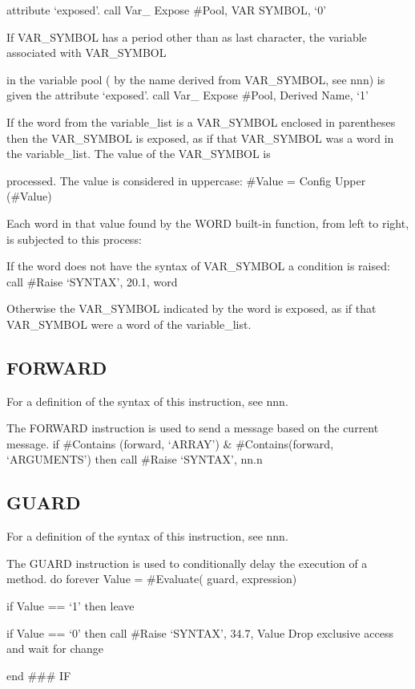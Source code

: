 attribute `exposed'. call Var\_ Expose \#Pool, VAR SYMBOL, `0'

If VAR\_SYMBOL has a period other than as last character, the variable
associated with VAR\_SYMBOL

in the variable pool ( by the name derived from VAR\_SYMBOL, see nnn) is
given the attribute `exposed'. call Var\_ Expose \#Pool, Derived Name,
`1'

If the word from the variable\_list is a VAR\_SYMBOL enclosed in
parentheses then the VAR\_SYMBOL is exposed, as if that VAR\_SYMBOL was
a word in the variable\_list. The value of the VAR\_SYMBOL is

processed. The value is considered in uppercase: \#Value = Config Upper
(\#Value)

Each word in that value found by the WORD built-in function, from left
to right, is subjected to this process:

If the word does not have the syntax of VAR\_SYMBOL a condition is
raised: call \#Raise `SYNTAX', 20.1, word

Otherwise the VAR\_SYMBOL indicated by the word is exposed, as if that
VAR\_SYMBOL were a word of the variable\_list.

\hypertarget{forward}{%
\subsection{FORWARD}\label{forward}}

For a definition of the syntax of this instruction, see nnn.

The FORWARD instruction is used to send a message based on the current
message. if \#Contains (forward, `ARRAY') \& \#Contains(forward,
`ARGUMENTS') then call \#Raise `SYNTAX', nn.n

\hypertarget{guard}{%
\subsection{GUARD}\label{guard}}

For a definition of the syntax of this instruction, see nnn.

The GUARD instruction is used to conditionally delay the execution of a
method. do forever Value = \#Evaluate( guard, expression)

if Value == `1' then leave

if Value == `0' then call \#Raise `SYNTAX', 34.7, Value Drop exclusive
access and wait for change

end \#\#\# IF

